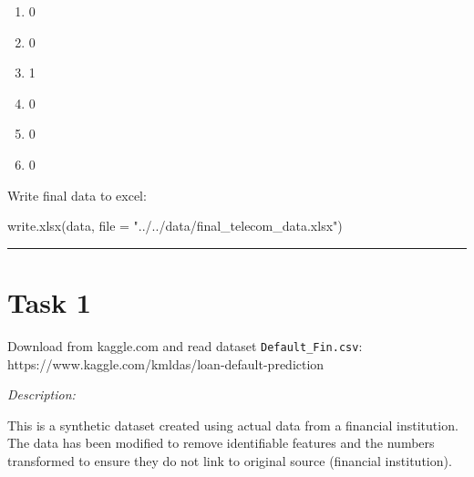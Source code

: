 \documentclass[
  letterpaper,
  DIV=11,
  numbers=noendperiod]{scrreprt}
\newenvironment{Shaded}{\begin{snugshade}}{\end{snugshade}}
\newcommand{\AttributeTok}[1]{\textcolor[rgb]{0.40,0.45,0.13}{#1}}
\newcommand{\DecValTok}[1]{\textcolor[rgb]{0.68,0.00,0.00}{#1}}
\newcommand{\FunctionTok}[1]{\textcolor[rgb]{0.28,0.35,0.67}{#1}}
\newcommand{\NormalTok}[1]{\textcolor[rgb]{0.00,0.23,0.31}{#1}}
\newcommand{\OtherTok}[1]{\textcolor[rgb]{0.00,0.23,0.31}{#1}}
\newcommand{\SpecialCharTok}[1]{\textcolor[rgb]{0.37,0.37,0.37}{#1}}
\newcommand{\StringTok}[1]{\textcolor[rgb]{0.13,0.47,0.30}{#1}}
\providecommand{\tightlist}{%
  \setlength{\itemsep}{0pt}\setlength{\parskip}{0pt}}\usepackage{longtable,booktabs,array}
\begin{document}
\begin{Shaded}
\end{Shaded}

\begin{Shaded}
\end{Shaded}

\begin{enumerate}
\def\labelenumi{\arabic{enumi}.}
\tightlist
\item
  0
\item
  0
\item
  1
\item
  0
\item
  0
\item
  0
\end{enumerate}

Write final data to excel:

\begin{Shaded}
\begin{Highlighting}[]
\FunctionTok{write.xlsx}\NormalTok{(data, }\AttributeTok{file =} \StringTok{"../../data/final\_telecom\_data.xlsx"}\NormalTok{)}
\end{Highlighting}
\end{Shaded}

\begin{center}\rule{0.5\linewidth}{0.5pt}\end{center}

\section{Task 1}\label{task-1}

Download from kaggle.com and read dataset \texttt{Default\_Fin.csv}:
https://www.kaggle.com/kmldas/loan-default-prediction

\emph{Description:}

This is a synthetic dataset created using actual data from a financial
institution. The data has been modified to remove identifiable features
and the numbers transformed to ensure they do not link to original
source (financial institution).
\end{document}
